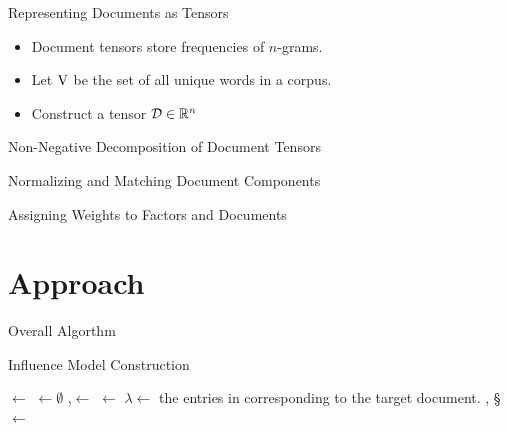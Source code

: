 \documentclass[handout]{beamer}
\begin{document}
\begin{frame}{Representing Documents as Tensors}
  \begin{itemize}[<+->]
  \item Document tensors store frequencies of $n$-grams.
  \item Let $\mathrm{V}$ be the set of all unique words in a corpus.
  \item Construct a tensor $\mathcal{D} \in \mathbb{R}^n$ 
  \end{itemize}
\end{frame}


\begin{frame}{Non-Negative Decomposition of Document Tensors}

\end{frame}


\begin{frame}{Normalizing and Matching Document Components}

\end{frame}


\begin{frame}{Assigning Weights to Factors and Documents}

\end{frame}



\section{Approach}
\begin{frame}{Overall Algorthm}
  \small
\begin{algorithm}[H]
  \caption{Influence Model Construction}
  \label{alg:model}

   
   
   
  
  \Output{\W, \S, \F}
  \BlankLine
  \;
  \V $\leftarrow$ \;
  \C $\leftarrow\emptyset$\;
  \LN,\F $\leftarrow$ \;
  \DM $\leftarrow$ \DistanceMatrix{\F}\;
  $\lambda \leftarrow$ the entries in \LN corresponding to the target document.\;
  \W, \S $\leftarrow$ \;
  \Return{\W, \S, \F}\;
\end{algorithm}
\end{frame}
\end{document}
